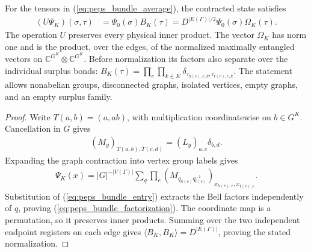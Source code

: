 \begin{lemma}%
    \label{thm:peps_regular_graph_bond_blocking}
    \leanok
    For the tensors in (\ref{eq:peps_bundle_average}), the contracted
    state satisfies
    \begin{align}
        (U\Psi_K)(\sigma,\tau)
         & =\Psi_0(\sigma)B_K(\tau)
        =D^{|E(\Gamma)|/2}\Psi_0(\sigma)\Omega_K(\tau).
        \label{eq:peps_bundle_factorization}
    \end{align}
    The operation $U$ preserves every physical inner product. The vector
    $\Omega_K$ has norm one and is the product, over the edges, of the
    normalized maximally entangled vectors on $\mathbb C^{G^K}\otimes
        \mathbb C^{G^K}$. Before normalization its factors also separate over
    the individual surplus bonds:
    $B_K(\tau)=\prod_e\prod_{k\in K}
        \delta_{\tau_{h(e),e,k},\tau_{t(e),e,k}}$.
    The statement allows nonabelian groups, disconnected graphs, isolated
    vertices, empty graphs, and an empty surplus family.
\end{lemma}

\begin{proof}\leanok
    Write $T(a,b)=(a,ab)$, with multiplication coordinatewise on $b\in G^K$.
    Cancellation in $G$ gives
    \begin{align}
        (M_g)_{T(a,b),T(c,d)}=(L_g)_{a,c}\delta_{b,d}.
        \label{eq:peps_bundle_entry}
    \end{align}
    Expanding the graph contraction into vertex group labels gives
    \begin{align}
        \Psi_K(x)=|G|^{-|V(\Gamma)|}\sum_q
        \prod_e(M_{q_{h(e)}q_{t(e)}^{-1}})_{x_{h(e),e},x_{t(e),e}}.
    \end{align}
    Substitution of (\ref{eq:peps_bundle_entry}) extracts the Bell factors
    independently of $q$, proving (\ref{eq:peps_bundle_factorization}).
    The coordinate map is a permutation, so it preserves inner products.
    Summing over the two independent endpoint registers on each edge gives
    $\langle B_K,B_K\rangle=D^{|E(\Gamma)|}$, proving the stated normalization.
\end{proof}
